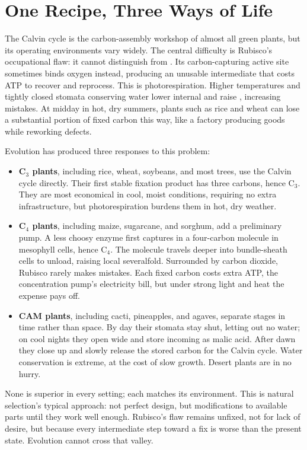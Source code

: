 \section{One Recipe, Three Ways of Life}

The Calvin cycle is the carbon-assembly workshop of almost all green plants, but its operating environments vary widely. The central difficulty is Rubisco's occupational flaw: it cannot distinguish  from . Its carbon-capturing active site sometimes binds oxygen instead, producing an unusable intermediate that costs ATP to recover and reprocess. This is photorespiration. Higher temperatures and tightly closed stomata conserving water lower internal  and raise , increasing mistakes. At midday in hot, dry summers, plants such as rice and wheat can lose a substantial portion of fixed carbon this way, like a factory producing goods while reworking defects.

Evolution has produced three responses to this problem:

\begin{itemize}[itemsep=2pt]
\item \textbf{C$_3$ plants}, including rice, wheat, soybeans, and most trees, use the Calvin cycle directly. Their first stable fixation product has three carbons, hence C$_3$. They are most economical in cool, moist conditions, requiring no extra infrastructure, but photorespiration burdens them in hot, dry weather.
\item \textbf{C$_4$ plants}, including maize, sugarcane, and sorghum, add a preliminary pump. A less choosy enzyme first captures  in a four-carbon molecule in mesophyll cells, hence C$_4$. The molecule travels deeper into bundle-sheath cells to unload, raising local  severalfold. Surrounded by carbon dioxide, Rubisco rarely makes mistakes. Each fixed carbon costs extra ATP, the concentration pump's electricity bill, but under strong light and heat the expense pays off.
\item \textbf{CAM plants}, including cacti, pineapples, and agaves, separate stages in time rather than space. By day their stomata stay shut, letting out no water; on cool nights they open wide and store incoming  as malic acid. After dawn they close up and slowly release the stored carbon for the Calvin cycle. Water conservation is extreme, at the cost of slow growth. Desert plants are in no hurry.
\end{itemize}

None is superior in every setting; each matches its environment. This is natural selection's typical approach: not perfect design, but modifications to available parts until they work well enough. Rubisco's flaw remains unfixed, not for lack of desire, but because every intermediate step toward a fix is worse than the present state. Evolution cannot cross that valley.

